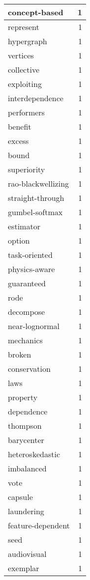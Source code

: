\begin{table}[h]
\begin{tabular}{|l|r|}
\hline
concept-based & 1 \\
\hline
represent & 1 \\
\hline
hypergraph & 1 \\
\hline
vertices & 1 \\
\hline
collective & 1 \\
\hline
exploiting & 1 \\
\hline
interdependence & 1 \\
\hline
performers & 1 \\
\hline
benefit & 1 \\
\hline
excess & 1 \\
\hline
bound & 1 \\
\hline
superiority & 1 \\
\hline
rao-blackwellizing & 1 \\
\hline
straight-through & 1 \\
\hline
gumbel-softmax & 1 \\
\hline
estimator & 1 \\
\hline
option & 1 \\
\hline
task-oriented & 1 \\
\hline
physics-aware & 1 \\
\hline
guaranteed & 1 \\
\hline
rode & 1 \\
\hline
decompose & 1 \\
\hline
near-lognormal & 1 \\
\hline
mechanics & 1 \\
\hline
broken & 1 \\
\hline
conservation & 1 \\
\hline
laws & 1 \\
\hline
property & 1 \\
\hline
dependence & 1 \\
\hline
thompson & 1 \\
\hline
barycenter & 1 \\
\hline
heteroskedastic & 1 \\
\hline
imbalanced & 1 \\
\hline
vote & 1 \\
\hline
capsule & 1 \\
\hline
laundering & 1 \\
\hline
feature-dependent & 1 \\
\hline
seed & 1 \\
\hline
audiovisual & 1 \\
\hline
exemplar & 1 \\
\hline

\end{tabular}
\end{table}
